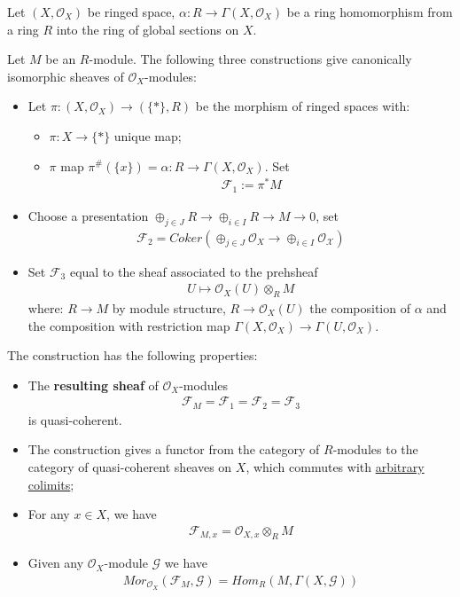 \documentclass[Total.tex]{subfiles}
\begin{document}
			\begin{lemma}
				Let $(X,\mathcal{O}_X)$ be ringed space, $\alpha:R\rightarrow \Gamma(X,\mathcal{O}_X)$ be a ring homomorphism from a ring $R$ into the ring of global sections on $X$.
				
				Let $M$ be an $R$-module. The following three constructions give canonically isomorphic sheaves of $\mathcal{O}_X$-modules:
				\begin{itemize}
					\item Let $\pi:(X,\mathcal{O}_X)\rightarrow (\{*\},R)$ be the morphism of ringed spaces with:
					
					\begin{itemize}
						\item $\pi:X\rightarrow \{*\}$ unique map;
						\item $\pi$ map $\pi^\#(\{x\})=\alpha:R\rightarrow \Gamma(X,\mathcal{O}_X)$. Set 
						\begin{gather*}
							\mathcal{F}_1:=\pi^*M
						\end{gather*}
					\end{itemize}
					\item Choose a presentation $\oplus_{j\in J} R\rightarrow \oplus_{i\in I} R\rightarrow M\rightarrow 0$, set 
					\begin{gather*}
						\mathcal{F}_2=Coker(\oplus_{j\in J} \mathcal{O}_X\rightarrow \oplus_{i\in I} \mathcal{O_X})
					\end{gather*}
					\item Set $\mathcal{F}_3$ equal to the sheaf associated to the prehsheaf 
					\begin{gather*}
						U\mapsto \mathcal{O}_X(U)\otimes_R M
					\end{gather*}
					where: $R\rightarrow M$ by module structure, $R\rightarrow \mathcal{O}_X(U)$ the composition of $\alpha$ and the composition with restriction map $\Gamma(X,\mathcal{O}_X)\rightarrow \Gamma(U,\mathcal{O}_X)$. 
				\end{itemize}
				The construction has the following properties:
				\begin{itemize}
					\item The \textbf{resulting sheaf} of $\mathcal{O}_X$-modules
					\begin{gather*}
						\mathcal{F}_M=\mathcal{F}_1=\mathcal{F}_2=\mathcal{F}_3
					\end{gather*}
					is quasi-coherent.
					\item The construction gives a functor from the category of $R$-modules to the category of quasi-coherent sheaves on $X$, which commutes with \underline{arbitrary colimits};
					\item For any $x\in X$, we have 
					\begin{gather*}
						\mathcal{F}_{M,x}=\mathcal{O}_{X,x}\otimes_R M
					\end{gather*}
					\item Given any $\mathcal{O}_X$-module $\mathcal{G}$ we have
					\begin{gather*}
						Mor_{\mathcal{O}_X}(\mathcal{F}_M,\mathcal{G})=Hom_R(M,\Gamma(X,\mathcal{G}))
					\end{gather*}
				\end{itemize}
			\end{lemma}
\end{document}

